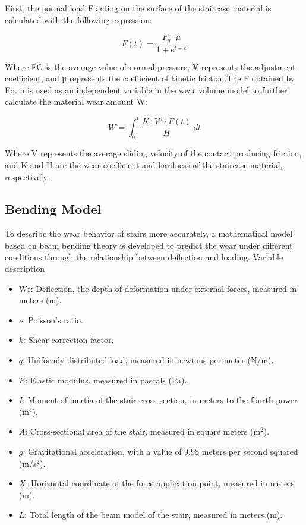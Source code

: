 \documentclass{mcmthesis}
\begin{document}
First, the normal load F acting on the surface of the staircase material is calculated with the following expression:

\[ F(t) = \frac{F_{q} \cdot \mu}{1 + e^{t - e}} \]

Where FG is the average value of normal pressure, ¥ represents the adjustment coefficient, and μ represents the coefficient of kinetic friction.The F obtained by Eq. n is used as an independent variable in the wear volume model to further calculate the material wear amount W:


\[ W = \int_{0}^{t} \frac{K \cdot V^{n} \cdot F(t)}{H} \ dt \]

Where V represents the average sliding velocity of the contact producing friction, and K and H are the wear coefficient and hardness of the staircase material, respectively.
\subsection{Bending Model}
To describe the wear behavior of stairs more accurately, a mathematical model based on beam bending theory is developed to predict the wear under different conditions through the relationship between deflection and loading.
Variable description
\begin{itemize} 

\item \( \text{Wr} \): Deflection, the depth of deformation under external forces, measured in meters (m). 

\item \( \nu \): Poisson's ratio. 

\item \( k \): Shear correction factor. 

\item \( q \): Uniformly distributed load, measured in newtons per meter (N/m). 

\item \( E \): Elastic modulus, measured in pascals (Pa). 

\item \( I \): Moment of inertia of the stair cross-section, in meters to the fourth power (m\(^4\)). 

\item \( A \): Cross-sectional area of the stair, measured in square meters (m\(^2\)). 

\item \( g \): Gravitational acceleration, with a value of 9.98 meters per second squared (m/s\(^2\)). 

\item \( X \): Horizontal coordinate of the force application point, measured in meters (m). 

\item \( L \): Total length of the beam model of the stair, measured in meters (m).

 \end{itemize}
\end{document}
